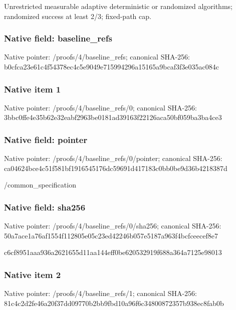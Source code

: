 \documentclass[10pt,a4paper]{article}
\begin{document}
\begingroup\raggedright\sloppy Unrestricted measurable adaptive deterministic or randomized algorithms;\allowbreak{} randomized success at least 2/\allowbreak{}3;\allowbreak{} fixed-path cap.\par\endgroup

\subsubsection{Native field: baseline\_\allowbreak{}refs}
Native pointer: /proofs/4/baseline\_\allowbreak{}refs; canonical SHA-256: b0cfca23e61c4f54378ec4c5e9049e715994296a15165a9bcaf3f3e035ac084c

\subsubsection{Native item 1}
Native pointer: /proofs/4/baseline\_\allowbreak{}refs/0; canonical SHA-256: 3bbc0ffe4e35b62e32eabf2963be0181ad39163f22126aca50bf059ba3ba4ce3

\subsubsection{Native field: pointer}
Native pointer: /proofs/4/baseline\_\allowbreak{}refs/0/pointer; canonical SHA-256: ca04624bce4c51f581bf1916545176dc59691d417183c0bb0be9d36b4218387d

\begingroup\raggedright\sloppy /\allowbreak{}common\_\allowbreak{}specification\par\endgroup

\subsubsection{Native field: sha256}
Native pointer: /proofs/4/baseline\_\allowbreak{}refs/0/sha256; canonical SHA-256: 50a7ace1a76af1554f112805e05c23ed42246b057e5187a963f4bcfceecef8e7

\begingroup\raggedright\sloppy c6cf8951aaa936a2621655d11aa144eff0be620532919f688a364a7125e98013\par\endgroup

\subsubsection{Native item 2}
Native pointer: /proofs/4/baseline\_\allowbreak{}refs/1; canonical SHA-256: 81c4c2d2fe46a20f37dd09770b2bb9fbd10a96f6c34800872357b938ec8fab0b
\end{document}

